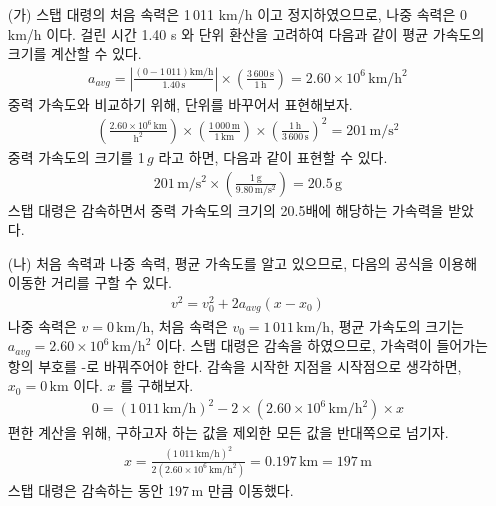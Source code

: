 \documentclass[APS,floatfix,nofootinbib,superscriptaddress,fleqn,preprint]{revtex4}
\begin{document}
\begin{itemize}
  \item [(가)] 스탭 대령의 처음 속력은 1\,011 km/h 이고 정지하였으므로, 나중 속력은 0 km/h 이다. 걸린 시간 1.40 s 와 단위 환산을 고려하여 다음과 같이 평균 가속도의 크기를 계산할 수 있다.
  \begin{align}
    a_{avg} = \left|\frac{(0-1\,011)\mathrm{km/h}}{1.40 \,\mathrm{s}}\right|\times\left(\frac{3\,600\,\mathrm{s}}{1\,\mathrm{h}}\right)=2.60\times 10^6\,\mathrm{km/h^2}
  \end{align} 
  중력 가속도와 비교하기 위해, 단위를 바꾸어서 표현해보자.
  \begin{align}
    \left(\mathrm{\frac{2.60\times 10^6\,km}{h^2}}\right)\times\left(\mathrm{\frac{1\,000\,m}{1\,km}}\right)\times\mathrm{\left(\frac{1\,h}{3\,600\,s}\right)^2}=201\,\mathrm{m/s^2}
  \end{align}
  중력 가속도의 크기를 1\,$g$ 라고 하면, 다음과 같이 표현할 수 있다.
  \begin{align}
  \mathrm{201\,m/s^2}\times\left(\frac{1\,\mathrm{g}}{9.80\,\mathrm{m/s^2}}\right) = 20.5\,\mathrm{g}
  \end{align} 
  스탭 대령은 감속하면서 중력 가속도의 크기의 20.5배에 해당하는 가속력을 받았다.
  \item [(나)] 처음 속력과 나중 속력, 평균 가속도를 알고 있으므로, 다음의 공식을 이용해 이동한 거리를 구할 수 있다.
  \begin{align}
    v^2=v_0^2+2a_{avg}(x-x_0)
  \end{align}
  나중 속력은 $v=\mathrm{0\,km/h}$, 처음 속력은 $v_0=\mathrm{1\,011\,km/h}$, 평균 가속도의 크기는 $a_{avg}=2.60\times 10^6\,\mathrm{km/h^2}$ 이다. 스탭 대령은 감속을 하였으므로, 가속력이 들어가는 항의 부호를 -로 바꿔주어야 한다. 감속을 시작한 지점을 시작점으로 생각하면, $x_0=0\,\mathrm{km}$ 이다. $x$ 를 구해보자.
  \begin{align}
    0=\left(\mathrm{1\,011\,km/h}\right)^2-2\times\left(2.60\times 10^6\,\mathrm{km/h^2}\right)\times x
  \end{align}    
  편한 계산을 위해, 구하고자 하는 값을 제외한 모든 값을 반대쪽으로 넘기자.
  \begin{align}    
    x=\frac{\left(\mathrm{1\,011\,km/h}\right)^2}{2\left(2.60\times 10^6\,\mathrm{km/h^2}\right)}=0.197\,\mathrm{km}=197\,\mathrm{m}
  \end{align}
  스탭 대령은 감속하는 동안 197\,m 만큼 이동했다.
\end{itemize}

\newpage
\end{document}
